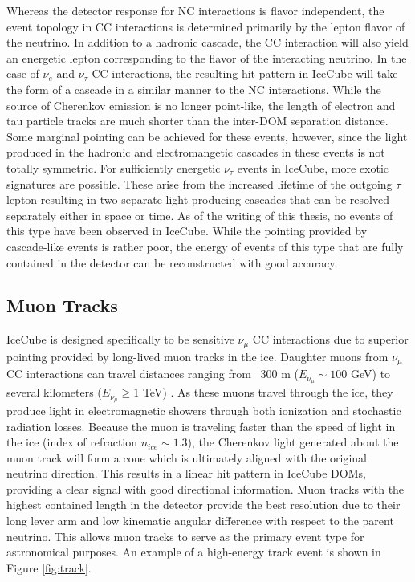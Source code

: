 \documentclass{gatech-thesis}
\begin{document}
Whereas the detector response for NC interactions is flavor independent, the event topology in CC interactions is determined primarily by the lepton flavor of the neutrino. In addition to a hadronic cascade, the CC interaction will also yield an energetic lepton corresponding to the flavor of the interacting neutrino. In the case of $\nu_{e}$ and $\nu_{\tau}$ CC interactions, the resulting hit pattern in IceCube will take the form of a cascade in a similar manner to the NC interactions. While the source of Cherenkov emission is no longer point-like, the length of electron and tau particle tracks are much shorter than the inter-DOM separation distance. Some marginal pointing can be achieved for these events, however, since the light produced in the hadronic and electromangetic cascades in these events is not totally symmetric. For sufficiently energetic $\nu_{\tau}$ events in IceCube, more exotic signatures are possible. These arise from the increased lifetime of the outgoing $\tau$ lepton resulting in two separate light-producing cascades that can be resolved separately either in space or time. As of the writing of this thesis, no events of this type have been observed in IceCube. While the pointing provided by cascade-like events is rather poor, the energy of events of this type that are fully contained in the detector can be reconstructed with good accuracy. 

\subsection{Muon Tracks}
IceCube is designed specifically to be sensitive $\nu_{\mu}$ CC interactions due to superior pointing provided by long-lived muon tracks in the ice. Daughter muons from $\nu_{\mu}$ CC interactions can travel distances ranging from ~300 m ($E_{\nu_{\mu}}\sim 100$ GeV) to several kilometers ($E_{\nu_{\mu}}\geq 1$ TeV) \cite{2001PhRvD..63i4020I}. As these muons travel through the ice, they produce light in electromagnetic showers through both ionization and stochastic radiation losses. Because the muon is traveling faster than the speed of light in the ice (index of refraction $n_{ice} \sim 1.3$), the Cherenkov light generated about the muon track will form a cone which is ultimately aligned with the original neutrino direction. This results in a linear hit pattern in IceCube DOMs, providing a clear signal with good directional information. Muon tracks with the highest contained length in the detector provide the best resolution due to their long lever arm and low kinematic angular difference with respect to the parent neutrino. This allows muon tracks to serve as the primary event type for astronomical purposes. An example of a high-energy track event is shown in Figure \ref{fig:track}.
\end{document}
